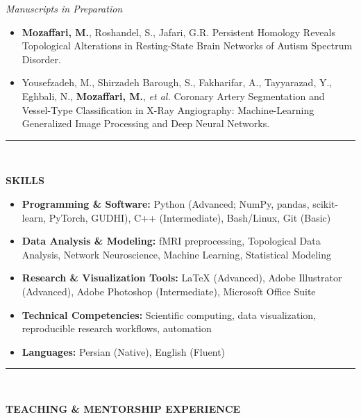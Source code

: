 \documentclass[12pt, b4paper]{cv}
\begin{document}
\textit{Manuscripts in Preparation}
\begin{itemize}[leftmargin=*]
    \item \textbf{Mozaffari, M.}, Roshandel, S., Jafari, G.R.
    Persistent Homology Reveals Topological Alterations in Resting-State Brain Networks of Autism Spectrum Disorder.

    \item Yousefzadeh, M., Shirzadeh Barough, S., Fakharifar, A., Tayyarazad, Y., Eghbali, N., \textbf{Mozaffari, M.}, \textit{et al.}
    Coronary Artery Segmentation and Vessel-Type Classification in X-Ray Angiography: Machine-Learning Generalized Image Processing and Deep Neural Networks.

\end{itemize}


\pagebreak


\vspace{-0.15in}
\rule{\textwidth}{1pt}\\
\vspace{-0.15in}


{\Large \textbf{SKILLS}}

\begin{itemize}[leftmargin=*]
    \item \textbf{Programming \& Software:} Python (Advanced; NumPy, pandas, scikit-learn, PyTorch, GUDHI), C++ (Intermediate), Bash/Linux, Git (Basic)
    \item \textbf{Data Analysis \& Modeling:} fMRI preprocessing, Topological Data Analysis, Network Neuroscience, Machine Learning, Statistical Modeling
    \item \textbf{Research \& Visualization Tools:} \LaTeX{} (Advanced), Adobe Illustrator (Advanced), Adobe Photoshop (Intermediate), Microsoft Office Suite
    \item \textbf{Technical Competencies:} Scientific computing, data visualization, reproducible research workflows, automation
    \item \textbf{Languages:} Persian (Native), English (Fluent)
\end{itemize}


\vspace{-0.15in}
\rule{\textwidth}{1pt}\\
\vspace{-0.15in}

{\Large \textbf{TEACHING \& MENTORSHIP EXPERIENCE}}
\vspace{0.1in}
\end{document}
